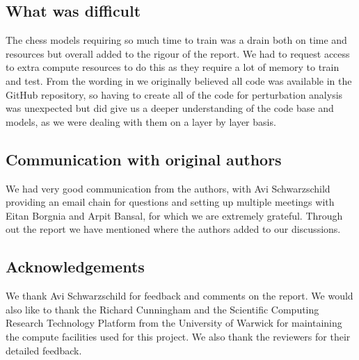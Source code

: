 \subsection{What was difficult}

The chess models requiring so much time to train was a drain both on time and resources but overall added to the rigour of the report. We had to request access to extra compute resources to do this as they require a lot of memory to train and test. 
From the wording in \cite{bansal2022endtoend} we originally believed all code was available in the GitHub repository, so having to create all of the code for perturbation analysis was unexpected but did give us a deeper understanding of the code base and models, as we were dealing with them on a layer by layer basis.

\subsection{Communication with original authors}
We had very good communication from the authors, with Avi Schwarzschild providing an email chain for questions and setting up multiple meetings with Eitan Borgnia and Arpit Bansal, for which we are extremely grateful. Through out the report we have mentioned where the authors added to our discussions.

\subsection{Acknowledgements}
We thank Avi Schwarzschild for feedback and comments on the report. We would also like to thank the Richard Cunningham and the Scientific Computing Research Technology Platform from the University of Warwick for maintaining the compute facilities used for this project. We also thank the reviewers for their detailed feedback.